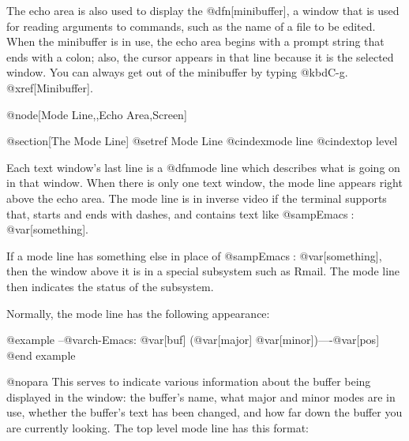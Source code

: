   The echo area is also used to display the @dfn[minibuffer], a window
that is used for reading arguments to commands, such as
the name of a file to be edited.  When the minibuffer is in use, the
echo area begins with a prompt string that ends with a colon; also,
the cursor appears in that line because it is the selected window.
You can always get out of the minibuffer by typing @kbd{C-g}.  @xref[Minibuffer].

@node[Mode Line,,Echo Area,Screen]

@section[The Mode Line]
@setref Mode Line
@cindex{mode line}
@cindex{top level}

  Each text window's last line is a @dfn{mode line} which describes what is
going on in that window.  When there is only one text window, the mode line
appears right above the echo area.  The mode line is in inverse video if
the terminal supports that, starts and ends with dashes, and contains text
like @samp{Emacs: @var[something]}.

  If a mode line has something else in place of @samp{Emacs:
@var[something]}, then the window above it is in a special subsystem such
as Rmail.  The mode line then indicates the status of the subsystem.

  Normally, the mode line has the following appearance:

@example
--@var{ch}-Emacs: @var[buf]      (@var[major] @var[minor])----@var[pos]%
@end example

@nopara
This serves to indicate various information about the buffer being
displayed in the window: the buffer's name, what major and minor modes are
in use, whether the buffer's text has been changed, and how far down the
buffer you are currently looking.  The top level mode line has this format:

